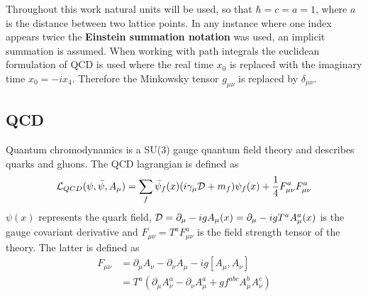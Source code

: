 Throughout this work natural units will be used, so that $\hbar = c = a = 1$, where $a$ is the distance between two lattice points.	In any instance where one index appears twice the \textbf{Einstein summation notation} was used, an implicit summation is assumed. When working with path integrals the euclidean formulation of QCD is used where the real time $x_0$ is replaced with the imaginary time $x_0 = -ix_4$. Therefore the Minkowsky tensor $g_{\mu\nu}$ is replaced by $\delta_{\mu\nu}$.
	
\subsection{QCD}
	Quantum chromodynamics is a SU(3) gauge quantum field theory and describes quarks and gluons. The QCD lagrangian is defined as \cite{qcd1_script_philipsen}
	\begin{equation}
	    \mathcal{L}_{QCD}(\psi,\bar{\psi},A_\mu) = \sum_f \bar{\psi}_f(x)(i\gamma_\mu\mathcal{D} + m_f)\psi_f(x) + \frac{1}{4}F^a_{\mu\nu}F^a_{\mu\nu}
	    \label{qcd_lagrangian}
	\end{equation}
	$\psi(x)$ represents the quark field, $\mathcal{D} = \partial_\mu - igA_\mu(x) = \partial_\mu-igT^aA^a_\mu(x)$ is the gauge covariant derivative and $F_{\mu\nu} = T^aF^a_{\mu\nu}$ is the field strength tensor of the theory. The latter is defined as
	\begin{equation}\label{strenth_tensor}
	\begin{aligned}
	    F_{\mu\nu} &= \partial_\mu A_\nu - \partial_\nu A_\mu-ig[A_\mu,A_\nu]\\
	    &= T^a(\partial_\mu A^a_\nu - \partial_\nu A^a_\mu + g f^{abc}A^b_\mu A^c_\nu)
	\end{aligned}
	\end{equation}
	
